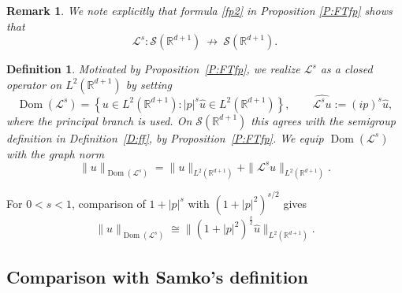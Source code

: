\documentclass[11pt,letter]{amsart}
\def \RNu {\mathbb{R}^{d+1}}
\def \R {\mathbb{R}}
\numberwithin{equation}{section}
\newcommand{\Le}{\mathcal L}
\newcommand{\Dom}{\operatorname{Dom}}
\newtheorem{remark}[theorem]{Remark}
\newtheorem{definition}[theorem]{Definition}
\numberwithin{equation}{section}
\begin{document}
\begin{remark}\label{R:not}
We note explicitly that formula \eqref{fp2} in Proposition \ref{P:FTfp} shows that 
\[
\Le^s:\mathscr S(\R^{d+1})\ \not\longrightarrow\ \mathscr S(\R^{d+1}).
\]
\end{remark}

\begin{definition}\label{D:domain}
Motivated by Proposition~\ref{P:FTfp}, we realize $\Le^s$ as a closed
operator on $L^2(\RNu)$ by setting
\[
\Dom(\Le^s)
=
\left\{u\in L^2(\RNu): |p|^s\widehat u\in L^2(\RNu)\right\},
\qquad
\widehat{\Le^su}:=(ip)^s\widehat u,
\]
where the principal branch is used. On $\mathscr S(\RNu)$ this agrees with the
semigroup definition in Definition~\ref{D:ff}, by Proposition~\ref{P:FTfp}.
We equip $\Dom(\Le^s)$ with the graph norm
\[
\|u\|_{\Dom(\Le^s)}
=
\|u\|_{L^2(\RNu)}+\|\Le^su\|_{L^2(\RNu)}.
\]
\end{definition}
For $0<s<1$, comparison of $1+|p|^s$ with $(1+|p|^2)^{s/2}$ gives
\begin{equation}\label{equigraph}
\|u\|_{\Dom(\Le^s)}
\cong \|(1+|p|^2)^{\frac s2}\widehat u\|_{L^2(\RNu)}.
\end{equation}


 
\subsection{Comparison with Samko's definition}\label{S:samko}
\end{document}
